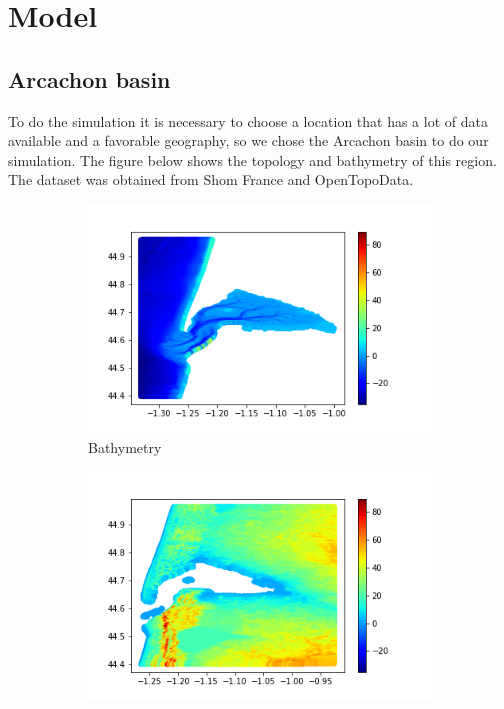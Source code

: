 \chapter{Model}
\label{chapter4}
\section{Arcachon basin}
To do the simulation it is necessary to choose a location that has a lot of data available and a favorable geography, so we chose the Arcachon basin to do our simulation. The figure below shows the topology and bathymetry of this region.
The dataset was obtained from Shom France and OpenTopoData.
\vspace*{-0.85cm}
\begin{figure}[h]
    \hspace*{-1.5cm}
    \begin{subfigure}{0.5\textwidth}
        \centering
        \includegraphics[scale=0.5]{images/Mesh/Mar_data.png}
        \caption{Bathymetry}
        \label{fig:sub1}
    \end{subfigure}%
    \hspace*{-2.7cm}
    \begin{subfigure}{0.5\textwidth}
        \centering
        \includegraphics[scale=0.5]{images/Mesh/Topo_data.png}

\end{subfigure}
\end{figure}
